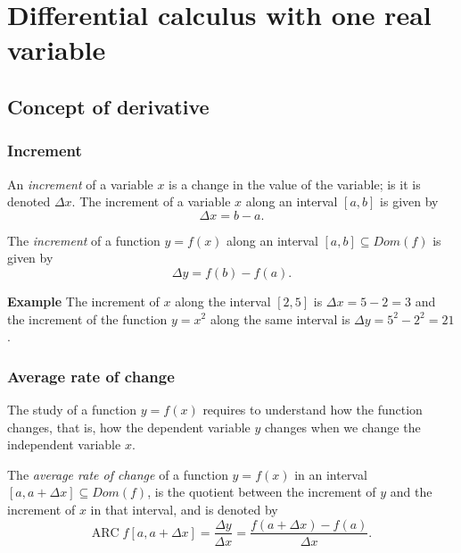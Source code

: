 \section{Differential calculus with one real variable}



\subsection{Concept of derivative}
\begin{frame}
	\frametitle{Increment}
	\begin{definition}
		An \emph{increment} of a variable $x$ is a change in the value of the variable; is it is denoted $\Delta x$.
		The increment of a variable $x$ along an interval $[a,b]$ is given by
		\[
			\Delta x = b-a.
		\]
	\end{definition}
	
	\begin{definition}
		The \emph{increment} of a function $y=f(x)$ along an interval $[a,b]\subseteq Dom(f)$ is given by
		\[
			\Delta y = f(b)-f(a).
		\]
	\end{definition}
	
	\textbf{Example} The increment of $x$ along the interval $[2,5]$ is $\Delta x=5-2=3$ and the increment of the function $y=x^2$ along the same interval is $\Delta y=5^2-2^2=21$.
\end{frame}

\begin{frame}
	\frametitle{Average rate of change}
	The study of a function $y=f(x)$ requires to understand how the function changes, that is, how the dependent variable $y$ changes when we change the independent variable $x$.
	
	\begin{definition}
		The  \emph{average rate of change} of a function $y=f(x)$ in an interval $[a,a+\Delta x]\subseteq Dom(f)$, is the quotient between the increment of $y$ and the increment of $x$ in that interval, and is denoted by
		\[
			\mbox{ARC}\;f[a,a+\Delta x]=\frac{\Delta y}{\Delta x}=\frac{f(a+\Delta x)-f(a)}{\Delta x}.
		\]
	\end{definition}
\end{frame}

